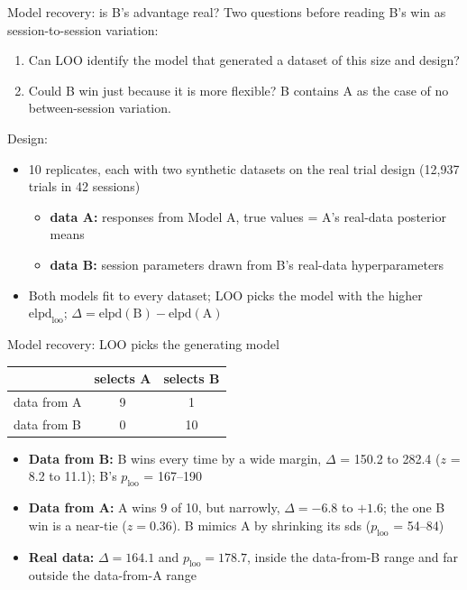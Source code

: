 \begin{frame}{Model recovery: is B's advantage real?}
  Two questions before reading B's win as session-to-session variation:
  \begin{enumerate}
    \item Can LOO identify the model that generated a dataset of this size and design?
    \item Could B win just because it is more flexible? B contains A as the case of no
          between-session variation.
  \end{enumerate}
  \vspace{0.5em}
  Design:
  \begin{itemize}
    \item 10 replicates, each with two synthetic datasets on the real trial design
          (12{,}937 trials in 42 sessions)
    \begin{itemize}
      \item \textbf{data A:} responses from Model A, true values = A's real-data posterior means
      \item \textbf{data B:} session parameters drawn from B's real-data hyperparameters
    \end{itemize}
    \item Both models fit to every dataset; LOO picks the model with the higher
          $\text{elpd}_\text{loo}$; $\Delta = \text{elpd}(\text{B}) - \text{elpd}(\text{A})$
  \end{itemize}
\end{frame}

\begin{frame}{Model recovery: LOO picks the generating model}
  \centering
  \begin{tabular}{lcc}
    \toprule
     & selects A & selects B \\
    \midrule
    data from A & 9 & 1 \\
    data from B & 0 & 10 \\
    \bottomrule
  \end{tabular}

  \vspace{0.8em}
  \raggedright
  \begin{itemize}
    \item \textbf{Data from B:} B wins every time by a wide margin, $\Delta$ = 150.2 to 282.4
          ($z$ = 8.2 to 11.1); B's $p_\text{loo}$ = 167--190
    \item \textbf{Data from A:} A wins 9 of 10, but narrowly, $\Delta = -6.8$ to $+1.6$; the one
          B win is a near-tie ($z = 0.36$). B mimics A by shrinking its sds ($p_\text{loo}$ = 54--84)
    \item \textbf{Real data:} $\Delta = 164.1$ and $p_\text{loo} = 178.7$, inside the data-from-B
          range and far outside the data-from-A range
  \end{itemize}
\end{frame}

